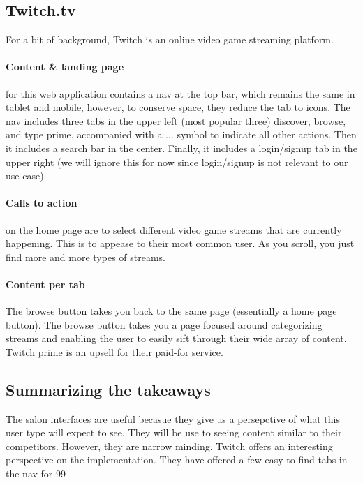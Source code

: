 \subsection{Twitch.tv}
For a bit of background, Twitch is an online video game streaming platform.

\paragraph{Content & landing page}
for this web application contains a nav at the top bar, which remains the same in tablet and mobile, however, to conserve space, they reduce the tab to icons. The nav includes three tabs in the upper left (most popular three) discover, browse, and type prime, accompanied with a ... symbol to indicate all other actions. Then it includes a search bar in the center. Finally, it includes a login/signup tab in the upper right (we will ignore this for now since login/signup is not relevant to our use case).

\paragraph{Calls to action}
on the home page are to select different video game streams that are currently happening. This is to appease to their most common user. As you scroll, you just find more and more types of streams.

\paragraph{Content per tab}
The browse button takes you back to the same page (essentially a home page button). The browse button takes you a page focused around categorizing streams and enabling the user to easily sift through their wide array of content. Twitch prime is an upsell for their paid-for service.

\subsection{Summarizing the takeaways}
The salon interfaces are useful becasue they give us a persepctive of what this user type will expect to see. They will be use to seeing content similar to their competitors. However, they are narrow minding. Twitch offers an interesting perspective on the implementation. They have offered a few easy-to-find tabs in the nav for 99%

